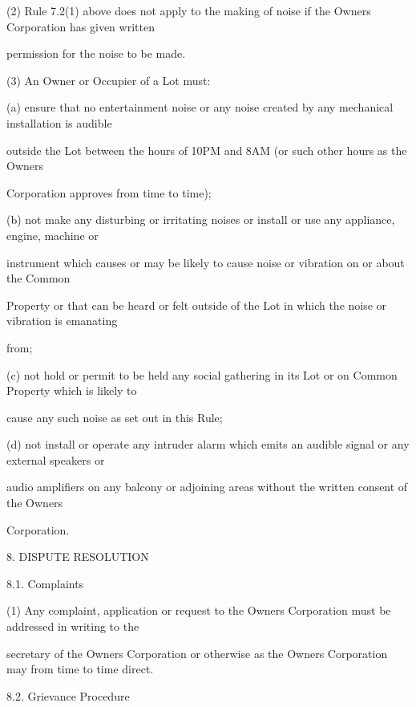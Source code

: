 \documentclass{article}
\begin{document}
{\fontsize{9.962}{1}(2) Rule 7.2(1) above does not apply to the making of noise if the Owners Corporation has given written }

{\fontsize{10.02}{1}permission for the noise to be made. }

{\fontsize{9.962}{1}(3) An Owner or Occupier of a Lot must: }

{\fontsize{9.962}{1}(a) ensure that no entertainment noise or any noise created by any mechanical installation is audible }

{\fontsize{10.02}{1}outside the Lot between the hours of 10PM and 8AM (or such other hours as the Owners }

{\fontsize{10.02}{1}Corporation approves from time to time); }

{\fontsize{9.962}{1}(b) not make any disturbing or irritating noises or install or use any appliance, engine, machine or }

{\fontsize{10.02}{1}instrument which causes or may be likely to cause noise or vibration on or about the Common }

{\fontsize{10.02}{1}Property or that can be heard or felt outside of the Lot in which the noise or vibration is emanating }

{\fontsize{10.02}{1}from; }

{\fontsize{9.962}{1}(c) not hold or permit to be held any social gathering in its Lot or on Common Property which is likely to }

{\fontsize{10.02}{1}cause any such noise as set out in this Rule; }

{\fontsize{9.962}{1}(d) not install or operate any intruder alarm which emits an audible signal or any external speakers or }

{\fontsize{10.02}{1}audio amplifiers on any balcony or adjoining areas without the written consent of the Owners }

{\fontsize{10.02}{1}Corporation. }


{\fontsize{9.99}{1}8. DISPUTE RESOLUTION }

{\fontsize{9.99}{1}8.1. Complaints }

{\fontsize{9.962}{1}(1) Any complaint, application or request to the Owners Corporation must be addressed in writing to the }

{\fontsize{10.02}{1}secretary of the Owners Corporation or otherwise as the Owners Corporation may from time to time direct. }

{\fontsize{9.99}{1}8.2. Grievance Procedure }
\end{document}
